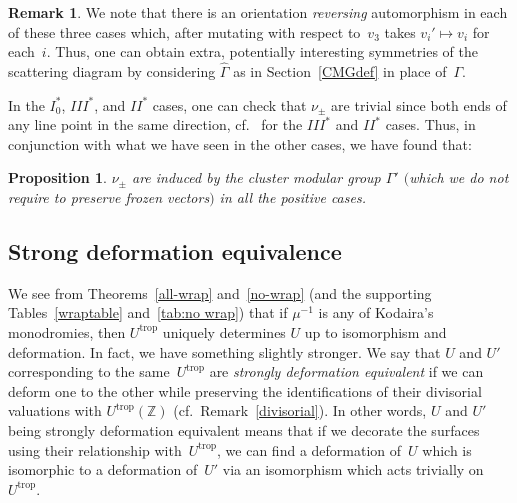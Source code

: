 \documentclass[10pt,a4paper]{amsart}
\numberwithin{equation}{section}
\numberwithin{figure}{section}
\numberwithin{table}{section}
\DeclareMathOperator{\trop}{trop}
\let\bb=\mathbb
\let\wh=\widehat
\newtheorem{prop}[thm]{Proposition}
\theoremstyle{definition}
\newtheorem{rmk}[thm]{Remark}
\begin{document}
\begin{rmk}\label{ExtendedModular}We note that there is an orientation {\it reversing} automorphism in each of these three cases which, after mutating with respect to~$v_3$ takes $v_i'\mapsto v_i$ for each~$i$. Thus, one can obtain extra, potentially interesting symmetries of the scattering diagram by considering $\wh{\Gamma}$ as in Section~\ref{CMGdef} in place of~$\Gamma$.
\end{rmk}

In the $I_0^*$, $III^*$, and $II^*$ cases, one can check that $\nu_{\pm}$ are trivial since both ends of any line point in the same direction, cf.\ \cite[Fig.~4.2(c,d)]{Man1} for the $III^*$ and $II^*$ cases. Thus, in conjunction with what we have seen in the other cases, we have found that:
\begin{prop}\label{nuAut}$\nu_{\pm}$ are induced by the cluster modular group $\Gamma'$ $($which we do not require to preserve frozen vectors$)$ in all the positive cases.
\end{prop}

\subsection{Strong deformation equivalence}

We see from Theorems~\ref{all-wrap} and~\ref{no-wrap} (and the supporting Tables~\ref{wraptable} and~\ref{tab:no wrap}) that if $\mu^{-1}$ is any of Kodaira's monodromies, then $U^{\trop}$ uniquely determines $U$ up to isomorphism and deformation. In fact, we have something slightly stronger. We say that $U$ and $U'$ corresponding to the same~$U^{\trop}$ are {\it strongly deformation equivalent} if we can deform one to the other while preserving the identifications of their divisorial valuations with $U^{\trop}(\bb{Z})$ (cf.\ Remark~\ref{divisorial}). In other words, $U$ and $U'$ being strongly deformation equivalent means that if we decorate the surfaces using their relationship with~$U^{\trop}$, we can find a deformation of~$U$ which is isomorphic to a deformation of~$U'$ via an isomorphism which acts trivially on~$U^{\trop}$.
\end{document}
